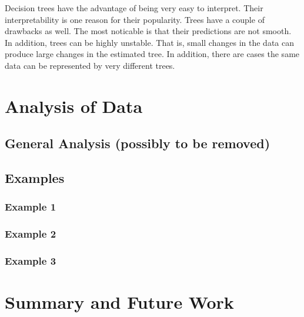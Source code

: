 \documentclass[12pt,twoside]{book}
\begin{document}
Decision trees have the advantage of being very easy to interpret. Their interpretability is one reason for their popularity. Trees have a couple of drawbacks as well. The most noticable is that their predictions are not smooth. In addition, trees can be highly unstable. That is, small changes in the data can produce large changes in the estimated tree. In addition, there are cases the same data can be represented by very different trees.


%
%

\chapter{Analysis of Data}

\section{General Analysis (possibly to be removed)}

\section{Examples}

\subsection{Example 1}

\subsection{Example 2}

\subsection{Example 3}

%
%

\chapter{Summary and Future Work}



\appendix
{}

%
%
\end{document}
